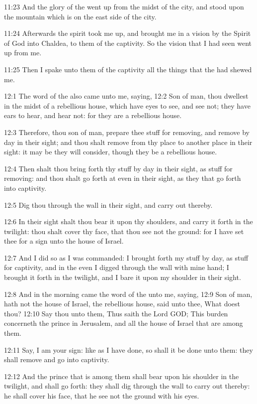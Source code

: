 11:23 And the glory of the \LORD went up from the midst of the city, and stood upon the mountain which is on the east side of the city.

11:24 Afterwards the spirit took me up, and brought me in a vision by the Spirit of God into Chaldea, to them of the captivity. So the vision that I had seen went up from me.

11:25 Then I spake unto them of the captivity all the things that the \LORD had shewed me.

12:1 The word of the \LORD also came unto me, saying, 12:2 Son of man, thou dwellest in the midst of a rebellious house, which have eyes to see, and see not; they have ears to hear, and hear not: for they are a rebellious house.

12:3 Therefore, thou son of man, prepare thee stuff for removing, and remove by day in their sight; and thou shalt remove from thy place to another place in their sight: it may be they will consider, though they be a rebellious house.

12:4 Then shalt thou bring forth thy stuff by day in their sight, as stuff for removing: and thou shalt go forth at even in their sight, as they that go forth into captivity.

12:5 Dig thou through the wall in their sight, and carry out thereby.

12:6 In their sight shalt thou bear it upon thy shoulders, and carry it forth in the twilight: thou shalt cover thy face, that thou see not the ground: for I have set thee for a sign unto the house of Israel.

12:7 And I did so as I was commanded: I brought forth my stuff by day, as stuff for captivity, and in the even I digged through the wall with mine hand; I brought it forth in the twilight, and I bare it upon my shoulder in their sight.

12:8 And in the morning came the word of the \LORD unto me, saying, 12:9 Son of man, hath not the house of Israel, the rebellious house, said unto thee, What doest thou?  12:10 Say thou unto them, Thus saith the Lord GOD; This burden concerneth the prince in Jerusalem, and all the house of Israel that are among them.

12:11 Say, I am your sign: like as I have done, so shall it be done unto them: they shall remove and go into captivity.

12:12 And the prince that is among them shall bear upon his shoulder in the twilight, and shall go forth: they shall dig through the wall to carry out thereby: he shall cover his face, that he see not the ground with his eyes.

